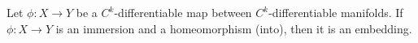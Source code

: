 Let $\phi: X \to Y$ be a $C^k$-differentiable map between $C^k$-differentiable manifolds. If $\phi: X \to Y$ is an immersion and a homeomorphism (into), then it is an embedding.

